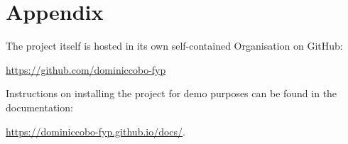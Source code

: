 \chapter{Appendix}


The project itself is hosted in its own self-contained Organisation on GitHub:

\url{https://github.com/dominiccobo-fyp}

Instructions on installing the project for demo purposes can be found in the documentation:

\url{https://dominiccobo-fyp.github.io/docs/}.